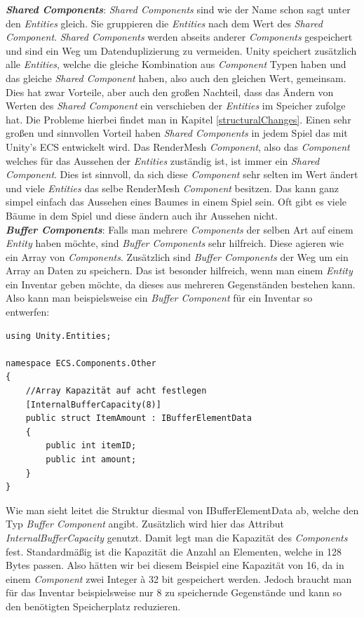 \documentclass[12pt, titlepage]{article}
\DeclareRobustCommand{\#}{\adjustbox{valign=B,totalheight=.57\baselineskip}{\oldhash}}%
\begin{document}
\textbf{\textit{Shared Components}}: \textit{Shared Components} sind wie der Name schon sagt unter den \textit{Entities} gleich. Sie gruppieren die \textit{Entities} nach dem Wert des \textit{Shared Component}. \textit{Shared Components} werden abseits anderer \textit{Components} gespeichert und sind ein Weg um Datenduplizierung zu vermeiden. Unity speichert zusätzlich alle \textit{Entities}, welche die gleiche Kombination aus \textit{Component} Typen haben und das gleiche \textit{Shared Component} haben, also auch den gleichen Wert, gemeinsam. Dies hat zwar Vorteile, aber auch den großen Nachteil, dass das Ändern von Werten des \textit{Shared Component} ein verschieben der \textit{Entities} im Speicher zufolge hat. Die Probleme hierbei findet man in Kapitel \ref{structuralChanges}. Einen sehr großen und sinnvollen Vorteil haben \textit{Shared Components} in jedem Spiel das mit Unity's ECS entwickelt wird. Das RenderMesh \textit{Component}, also das \textit{Component} welches für das Aussehen der \textit{Entities} zuständig ist, ist immer ein \textit{Shared Component}. Dies ist sinnvoll, da sich diese \textit{Component} sehr selten im Wert ändert und viele \textit{Entities} das selbe RenderMesh \textit{Component} besitzen. Das kann ganz simpel einfach das Aussehen eines Baumes in einem Spiel sein. Oft gibt es viele Bäume in dem Spiel und diese ändern auch ihr Aussehen nicht.\\
\textbf{\textit{Buffer Components}}: Falls man mehrere \textit{Components} der selben Art auf einem \textit{Entity} haben möchte, sind \textit{Buffer Components} sehr hilfreich. Diese agieren wie ein Array von \textit{Components}. Zusätzlich sind \textit{Buffer Components} der Weg um ein Array an Daten zu speichern. Das ist besonder hilfreich, wenn man einem \textit{Entity} ein Inventar geben möchte, da dieses aus mehreren Gegenständen bestehen kann. Also kann man beispielsweise ein \textit{Buffer Component} für ein Inventar so entwerfen:
\begin{lstlisting}[style=code, caption={Buffer \textit{Component} Beispiel}]
using Unity.Entities;

namespace ECS.Components.Other
{
	//Array Kapazität auf acht festlegen
    [InternalBufferCapacity(8)]
    public struct ItemAmount : IBufferElementData
    {
        public int itemID;
        public int amount;
    }
}
\end{lstlisting}
Wie man sieht leitet die Struktur diesmal von IBufferElementData ab, welche den Typ \textit{Buffer Component} angibt. Zusätzlich wird hier das Attribut \textit{InternalBufferCapacity} genutzt. Damit legt man die Kapazität des \textit{Components} fest. Standardmäßig ist die Kapazität die Anzahl an Elementen, welche in 128 Bytes passen. Also hätten wir bei diesem Beispiel eine Kapazität von 16, da in einem \textit{Component} zwei Integer à 32 bit gespeichert werden. Jedoch braucht man für das Inventar beispielsweise nur 8 zu speichernde Gegenstände und kann so den benötigten Speicherplatz reduzieren.
\end{document}
